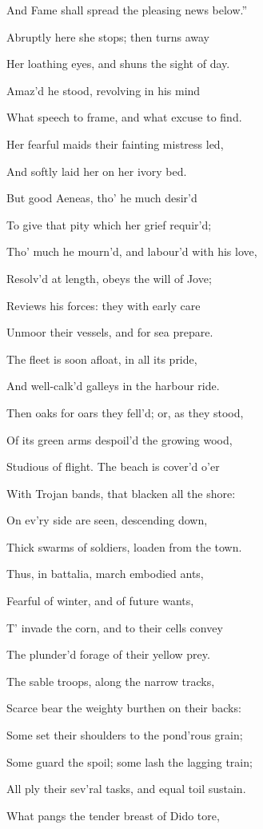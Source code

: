 And Fame shall spread the pleasing news below.”

Abruptly here she stops; then turns away

Her loathing eyes, and shuns the sight of day.

Amaz’d he stood, revolving in his mind

What speech to frame, and what excuse to find.

Her fearful maids their fainting mistress led,

And softly laid her on her ivory bed.

But good Aeneas, tho’ he much desir’d

To give that pity which her grief requir’d;

Tho’ much he mourn’d, and labour’d with his love,

Resolv’d at length, obeys the will of Jove;

Reviews his forces: they with early care

Unmoor their vessels, and for sea prepare.

The fleet is soon afloat, in all its pride,

And well-calk’d galleys in the harbour ride.

Then oaks for oars they fell’d; or, as they stood,

Of its green arms despoil’d the growing wood,

Studious of flight. The beach is cover’d o’er

With Trojan bands, that blacken all the shore:

On ev’ry side are seen, descending down,

Thick swarms of soldiers, loaden from the town.

Thus, in battalia, march embodied ants,

Fearful of winter, and of future wants,

T’ invade the corn, and to their cells convey

The plunder’d forage of their yellow prey.

The sable troops, along the narrow tracks,

Scarce bear the weighty burthen on their backs:

Some set their shoulders to the pond’rous grain;

Some guard the spoil; some lash the lagging train;

All ply their sev’ral tasks, and equal toil sustain.

What pangs the tender breast of Dido tore,

